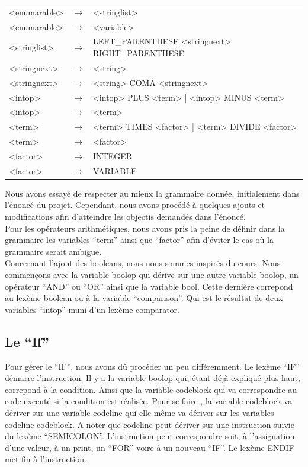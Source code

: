 \documentclass[10pt,a4paper]{article}
\begin{document}
\begin{tabular}{|l l l|}
		<enumarable> & $\longrightarrow$ & <stringlist>\\
		<enumarable> & $\longrightarrow$ & <variable>\\
		<stringlist> & $\longrightarrow$ & LEFT_PARENTHESE <stringnext> RIGHT_PARENTHESE\\
		<stringnext> & $\longrightarrow$ & <string>\\
		<stringnext> & $\longrightarrow$ & <string> COMA <stringnext>\\
		<intop> & $\longrightarrow$ & <intop> PLUS <term> | <intop> MINUS <term>\\
		<intop> & $\longrightarrow$ & <term>\\
		<term> & $\longrightarrow$ & <term> TIMES <factor> | <term> DIVIDE <factor> \\
		<term> & $\longrightarrow$ & <factor>\\
		<factor> & $\longrightarrow$ & INTEGER\\
		<factor> & $\longrightarrow$ & VARIABLE\\
		\hline
	\end{tabular}
	
	Nous avons essayé de respecter au mieux la grammaire donnée, initialement dans l'énoncé du projet.
	Cependant, nous avons procédé à quelques ajouts et modifications afin d'atteindre les objectis demandés dans 
	l'énoncé.\\
	Pour les opérateurs arithmétiques, nous avons pris la peine de définir dans la grammaire les variables ``term'' ainsi que ``factor'' afin d'éviter
	le cas où la grammaire serait ambiguë.\\
	Concernant l'ajout des booleans, nous nous sommes inspirés du cours. Nous commençons avec la variable boolop qui dérive sur une autre variable
	boolop, un opérateur ``AND'' ou ``OR'' ainsi que la variable bool. Cette dernière correpond au lexème boolean ou à la variable ``comparison''.
	Qui est le résultat de deux variables ``intop'' muni d'un lexème comparator.
	\subsection{Le ``If''}
	Pour gérer le ``IF'', nous avons dû procéder un peu différemment. Le lexème ``IF'' démarre l'instruction. Il y a la variable boolop qui, 
	étant déjà expliqué plus haut, correpond à la condition.
	Ainsi que la variable codeblock qui va correspondre au code executé si la condition est réalisée. Pour se faire , la variable codeblock va dériver
	sur une variable codeline qui elle même va dériver sur les variables codeline codeblock. A noter que codeline peut dériver sur une instruction
	suivie du lexème ``SEMICOLON''. L'instruction peut correspondre soit, à l'assignation d'une valeur, à un print, un ``FOR'' voire à un nouveau ``IF''.
	Le lexème ENDIF met fin à l'instruction.
	\\
\end{document}
